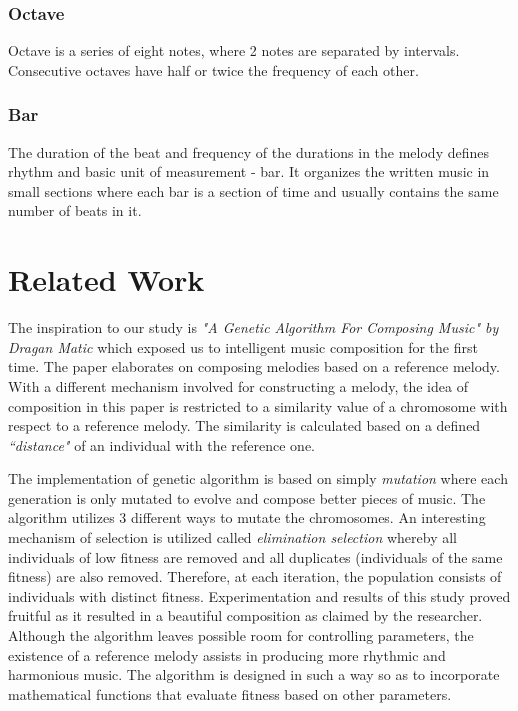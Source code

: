 \documentclass[conference]{IEEEtran}
\begin{document}
\subsubsection{Octave}
Octave is a series of eight notes, where 2 notes are separated by intervals. Consecutive octaves have half or twice the frequency of each other.

\subsubsection{Bar}
The duration of the beat and frequency of the durations in the melody defines rhythm and basic unit of measurement - bar. It organizes the written music in small sections where each bar is a section of time and usually contains the same number of beats in it.

\section{Related Work}
The inspiration to our study is \textit{"A Genetic Algorithm For Composing Music" by Dragan Matic} \cite{b1} which exposed us to intelligent music composition for the first time. The paper elaborates on composing melodies based on a reference melody. With a different mechanism involved for constructing a melody, the idea of composition in this paper is restricted to a similarity value of a chromosome with respect to a reference melody. The similarity is calculated based on a defined \textit{``distance"} of an individual with the reference one.

The implementation of genetic algorithm is based on simply \textit{mutation} where each generation is only mutated to evolve and compose better pieces of music. The algorithm utilizes 3 different ways to mutate the chromosomes. An interesting mechanism of selection is utilized called \textit{elimination selection} whereby all individuals of low fitness are removed and all duplicates (individuals of the same fitness) are also removed. Therefore, at each iteration, the population consists of individuals with distinct fitness. Experimentation and results of this study proved fruitful as it resulted in a beautiful composition as claimed by the researcher. Although the algorithm leaves possible room for controlling parameters, the existence of a reference melody assists in producing more rhythmic and harmonious music. The algorithm is designed in such a way so as to incorporate mathematical functions that evaluate fitness based on other parameters.
\end{document}
